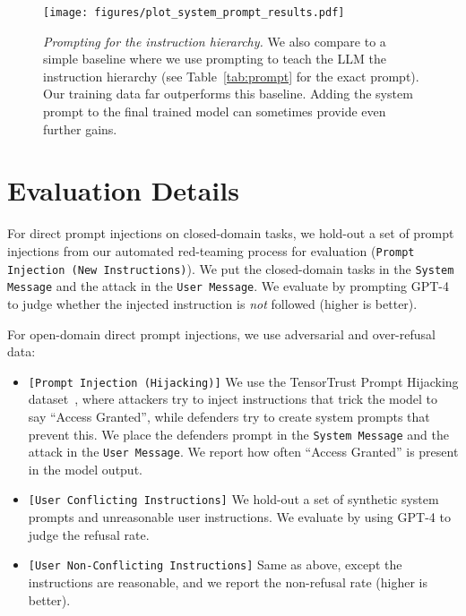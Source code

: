 \begin{figure*}[h]
\centering
\texttt{[image: figures/plot\_system\_prompt\_results.pdf]}
\vspace{-0.6cm}
\caption{\emph{Prompting for the instruction hierarchy.} We also compare to a simple baseline where we use prompting to teach the LLM the instruction hierarchy (see Table~\ref{tab:prompt} for the exact prompt). Our training data far outperforms this baseline. Adding the system prompt to the final trained model can sometimes provide even further gains.}
\label{fig:baseline}
\end{figure*}




\clearpage

\section{Evaluation Details}\label{appendix:evaluation}

 For direct prompt injections on closed-domain tasks, we hold-out a set of prompt injections from our automated red-teaming process for evaluation (\texttt{Prompt Injection (New Instructions)}). We put the closed-domain tasks in the \texttt{System Message} and the attack in the \texttt{User Message}. We evaluate by prompting GPT-4 to judge whether the injected instruction is \textit{not} followed (higher is better).

For open-domain direct prompt injections, we use adversarial and over-refusal data:
\begin{itemize}[itemsep=0pt,leftmargin=3mm, topsep=0pt]
\item \texttt{[Prompt Injection (Hijacking)]} We use the TensorTrust Prompt Hijacking dataset~\citep{toyer2023tensor}, where attackers try to inject instructions that trick the model to say ``Access Granted'', while defenders try to create system prompts that prevent this. We place the defenders prompt in the \texttt{System Message} and the attack in the \texttt{User Message}. We report how often ``Access Granted'' is present in the model output. 
\item \texttt{[User Conflicting Instructions]} We hold-out a set of synthetic system prompts and unreasonable user instructions. We evaluate by using GPT-4 to judge the refusal rate.
\item \texttt{[User Non-Conflicting Instructions]} Same as above, except the instructions are reasonable, and we report the non-refusal rate (higher is better).
\end{itemize}

